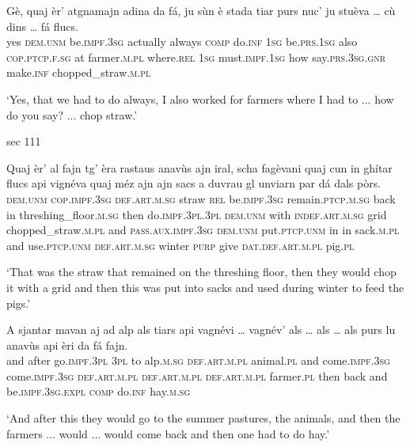 \begin{linenumbers}
	\gll Gè, quaj èr’ atgnamajn adina da fá, ju sùn è stada tiar purs nuc’ ju stuèva … cù dins … fá flucs.\\
	yes \textsc{dem.unm} be.\textsc{impf.3sg} actually always \textsc{comp} do.\textsc{inf} \textsc{1sg} be.\textsc{prs.1sg} also \textsc{cop.ptcp.f.sg} at farmer.\textsc{m.pl} where.\textsc{rel} \textsc{1sg} must.\textsc{impf.1sg} {} how say.\textsc{prs.3sg.gnr} {} make.\textsc{inf} chopped\_straw.\textsc{m.pl} \\
\end{linenumbers}
\medskip
\glt `Yes, that we had to do always, I also worked for farmers where I had to ... how do you say? ... chop straw.'
\medskip

sec 111

\begin{linenumbers}
	\gll Quaj èr’ al fajn tg’ èra rastaus anavùs ajn iral, scha fagèvani quaj cun in ghítar flucs api vignéva quaj méz ajn ajn sacs a duvrau gl unviarn par dá dals pòrs.\\
	\textsc{dem.unm} \textsc{cop.impf.3sg} \textsc{def.art.m.sg} straw \textsc{rel} be.\textsc{impf.3sg} remain.\textsc{ptcp.m.sg} back in threshing\_floor\textsc{.m.sg} then do.\textsc{impf.3pl.3pl} \textsc{dem.unm} with \textsc{indef.art.m.sg} grid chopped\_straw.\textsc{m.pl} and \textsc{pass.aux.impf.3sg} \textsc{dem.unm} put.\textsc{ptcp.unm} in in sack.\textsc{m.pl} and use.\textsc{ptcp.unm} \textsc{def.art.m.sg} winter \textsc{purp} give \textsc{dat.def.art.m.pl} pig.\textsc{pl}  \\
\end{linenumbers}
\medskip
\glt `That was the straw that remained on the threshing floor, then they would chop it with a grid and then this was put into sacks and used during winter to feed the pigs.'
\medskip

\begin{linenumbers}
	\gll A sjantar mavan aj ad alp als tiars api vagnévi … vagnév’  als … als … als purs lu anavùs api èri da fá fajn.\\
	and after go.\textsc{impf.3pl} \textsc{3pl} to alp.\textsc{m.sg} \textsc{def.art.m.pl} animal.\textsc{pl} and come.\textsc{impf.3sg} {} come.\textsc{impf.3sg} \textsc{def.art.m.pl} {} \textsc{def.art.m.pl} {} \textsc{def.art.m.pl} farmer.\textsc{pl} then back and be.\textsc{impf.3sg.expl} \textsc{comp} do.\textsc{inf} hay.\textsc{m.sg}\\
\end{linenumbers}
\medskip
\glt `And after this they would go to the summer pastures, the animals, and then the farmers ... would ... would come back and then one had to do hay.'
\medskip

